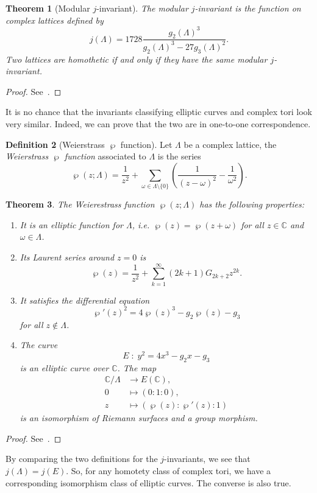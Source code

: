 \documentclass[10pt]{article}
\theoremstyle{plain}
\newtheorem{theorem}{Theorem}
\theoremstyle{definition}
\newtheorem{definition}[theorem]{Definition}
\begin{document}
\begin{theorem}[Modular $j$-invariant]
  The \emph{modular $j$-invariant} is the function on complex lattices
  defined by
  \[j(Λ) = 1728 \frac{g_2(Λ)^3}{g_2(Λ)^3 - 27g_3(Λ)^2}.\] %
  Two lattices are homothetic if and only if they have the same
  modular $j$-invariant.
\end{theorem}
\begin{proof}
  See~\cite[I, Th.~4.1]{silverman:advanced}.
\end{proof}

It is no chance that the invariants classifying elliptic curves and
complex tori look very similar. %
Indeed, we can prove that the two are in one-to-one correspondence.

\begin{definition}[Weierstrass $℘$ function]
  Let $Λ$ be a complex lattice, the \emph{Weierstrass $℘$ function}
  associated to $Λ$ is the series
  \[℘(z;Λ) = \frac{1}{z^2} + \sum_{ω∈Λ\setminus\{0\}} \left(\frac{1}{(z-ω)^2} - \frac{1}{ω^2}\right).\]
\end{definition}

\begin{theorem}
  The Weierestrass function $℘(z;Λ)$ has the following properties:
  \begin{enumerate}
  \item It is an \emph{elliptic function} for $Λ$, i.e.
    $℘(z) = ℘(z+ω)$ for all $z∈ℂ$ and $ω∈Λ$.
  \item Its Laurent series around $z=0$ is
    \[℘(z) = \frac{1}{z^2} + \sum_{k=1}^∞(2k+1)G_{2k+2}z^{2k}.\]
  \item It satisfies the differential equation
    \[℘'(z)^2 = 4℘(z)^3 - g_2℘(z) - g_3\]
    for all $z∉Λ$.
  \item The curve
    \[E\;:\;y^2=4x^3 - g_2x - g_3\]
    is an elliptic curve over $ℂ$. The map
    \begin{align*}
      ℂ/Λ &\to E(ℂ),\\
      0 &\mapsto (0:1:0),\\
      z &\mapsto (℘(z):℘'(z):1)
    \end{align*}
    is an isomorphism of Riemann surfaces and a group morphism.
  \end{enumerate}
\end{theorem}
\begin{proof}
  See~\cite[VI, Th.~3.1, Th.~3.5, Prop.~3.6]{silverman:elliptic}.
\end{proof}

By comparing the two definitions for the $j$-invariants, we see that
$j(Λ)=j(E)$. %
So, for any homotety class of complex tori, we have a corresponding
isomorphism class of elliptic curves. %
The converse is also true.
\end{document}
